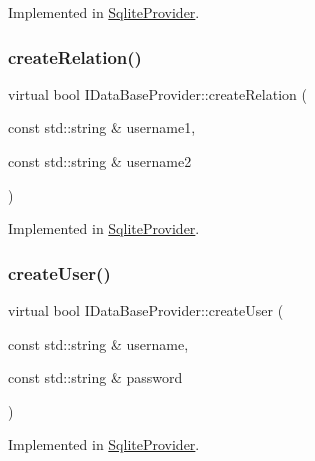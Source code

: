 Implemented in \mbox{\hyperlink{classSqliteProvider_a6dc02301bf2f012306eeed7e867cec08}{Sqlite\+Provider}}.

\mbox{\label{classIDataBaseProvider_ade3438db196aed2c67268f09a1b4a266}} 
\subsubsection{\texorpdfstring{create\+Relation()}{createRelation()}\hspace{0.1cm}{\footnotesize\ttfamily [2/2]}}
{\footnotesize\ttfamily virtual bool I\+Data\+Base\+Provider\+::create\+Relation (\begin{DoxyParamCaption}\item[{const std\+::string \&}]{username1,  }\item[{const std\+::string \&}]{username2 }\end{DoxyParamCaption})\hspace{0.3cm}{\ttfamily [pure virtual]}}



Implemented in \mbox{\hyperlink{classSqliteProvider_a452f16560299d7e5f9c3f738cba13172}{Sqlite\+Provider}}.

\mbox{\label{classIDataBaseProvider_ae959ea126a1fc1df9ffe058d5a3d9851}} 
\subsubsection{\texorpdfstring{create\+User()}{createUser()}}
{\footnotesize\ttfamily virtual bool I\+Data\+Base\+Provider\+::create\+User (\begin{DoxyParamCaption}\item[{const std\+::string \&}]{username,  }\item[{const std\+::string \&}]{password }\end{DoxyParamCaption})\hspace{0.3cm}{\ttfamily [pure virtual]}}



Implemented in \mbox{\hyperlink{classSqliteProvider_a7483b0b7156adba736b6b27f8b1826a0}{Sqlite\+Provider}}.

